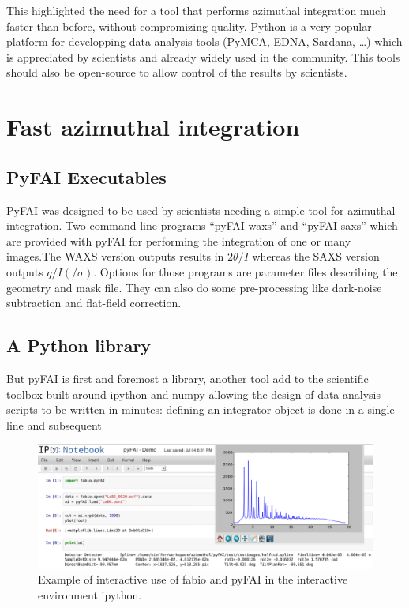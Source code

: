 \documentclass[a4paper]{jpconf}
\begin{document}
This highlighted the need for a tool that performs azimuthal integration much
faster than before, without compromizing quality. Python is a very popular
platform for developping data analysis tools (PyMCA, EDNA, Sardana, \ldots)
which is appreciated by scientists and already widely used in the community.
This tools should also be open-source to allow control of the results by
scientists.

\section{Fast azimuthal integration}
\subsection{PyFAI Executables}
PyFAI was designed to be used by scientists needing a simple tool for azimuthal
integration. Two command line programs “pyFAI-waxs” and “pyFAI-saxs” 
which are provided with pyFAI for performing the integration of one or many 
images.The WAXS version outputs results in $2\theta /I$  whereas the SAXS version outputs $q/I(/\sigma )$.
Options for those programs are parameter  files describing the geometry and mask file. They can
also do some  pre-processing like dark-noise subtraction and flat-field correction.



\subsection{A Python library}
But pyFAI is first and foremost a library, another tool add to the scientific
toolbox built around  ipython and numpy allowing the design of data analysis 
scripts to be written in minutes: defining an integrator object is done in a
single line and subsequent 
	
\begin{center}
\begin{figure}[h]
\includegraphics[width=15cm]{img/notebook-l.eps}
\caption{\label{notebook} Example of interactive use of fabio and pyFAI in the
interactive environment ipython.}
\end{figure}
\end{center}
	
\end{document}
